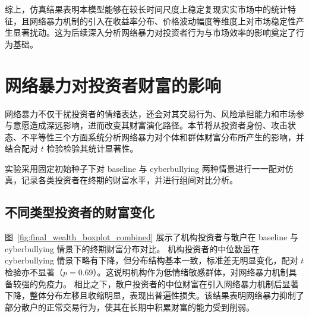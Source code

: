 综上，仿真结果表明本模型能够在较长时间尺度上稳定复现实实市场中的统计特征，且网络暴力机制的引入在收益率分布、价格波动幅度等维度上对市场稳定性产生显著扰动。这为后续深入分析网络暴力对投资者行为与市场效率的影响奠定了行为基础。






\section{网络暴力对投资者财富的影响}

网络暴力不仅干扰投资者的情绪表达，还会对其交易行为、风险承担能力和市场参与意愿造成深远影响，进而改变其财富演化路径。本节将从投资者身份、攻击状态、不平等性三个方面系统分析网络暴力对个体和群体财富分布所产生的影响，并结合配对 \(t\) 检验检验其统计显著性。

实验采用固定初始种子下对 baseline 与 cyberbullying 两种情景进行一一配对仿真，记录各类投资者在终期的财富水平，并进行组间对比分析。

\subsection{不同类型投资者的财富变化}

图~\ref{fig:final_wealth_boxplot_combined} 展示了机构投资者与散户在 baseline 与 cyberbullying 情景下的终期财富分布对比。
机构投资者的中位数虽在 cyberbullying 情景下略有下降，但分布结构基本一致，标准差无明显变化，配对 \(t\) 检验亦不显著（\(p = 0.69\)）。这说明机构作为低情绪敏感群体，对网络暴力机制具备较强的免疫力。
相比之下，散户投资者的中位财富在引入网络暴力机制后显著下降，整体分布左移且收缩明显，表现出普遍性损失。该结果表明网络暴力抑制了部分散户的正常交易行为，使其在长期中积累财富的能力受到削弱。




